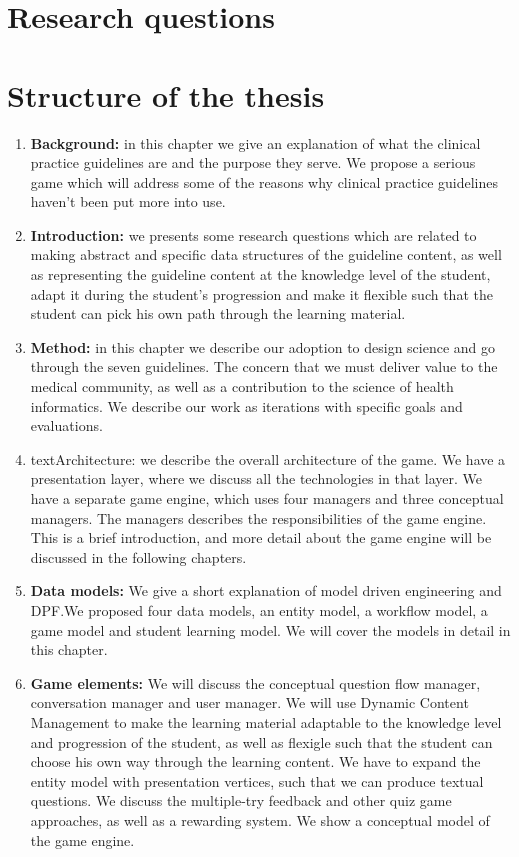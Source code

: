 

\section{Research questions}

\section{Structure of the thesis}
\begin{enumerate}
	\item \textbf{Background:} in this chapter we give an explanation of what the clinical practice guidelines are and the purpose they serve. We propose a serious game which will address some of the reasons why clinical practice guidelines haven't been put more into use.
	\item \textbf{Introduction:} we presents some research questions which are related to making abstract and specific data structures of the guideline content, as well as representing the guideline content at the knowledge level of the student, adapt it during the student's progression and make it flexible such that the student can pick his own path through the learning material.
	\item \textbf{Method:} in this chapter we describe our adoption to design science and go through the seven guidelines. The concern that we must deliver value to the medical community, as well as a contribution to the science of health informatics. We describe our work as iterations with specific goals and evaluations.
	\item text{Architecture:} we describe the overall architecture of the game. We have a presentation layer, where we discuss all the technologies in that layer. We have a separate game engine, which uses four managers and three conceptual managers. The managers describes the responsibilities of the game engine. This is a brief introduction, and more detail about the game engine will be discussed in the following chapters.
	\item \textbf{Data models:} We give a short explanation of model driven engineering and DPF.We proposed four data models, an entity model, a workflow model, a game model and student learning model. We will cover the models in detail in this chapter.
	\item \textbf{Game elements:} We will discuss the conceptual question flow manager, conversation manager and user manager. We will use Dynamic Content Management to make the learning material adaptable to the knowledge level and progression of the student, as well as flexigle such that the student can choose his own way through the learning content. We have to expand the entity model with presentation vertices, such that we can produce textual questions. We discuss the multiple-try feedback and other quiz game approaches, as well as a rewarding system. We show a conceptual model of the game engine.

\end{enumerate}
